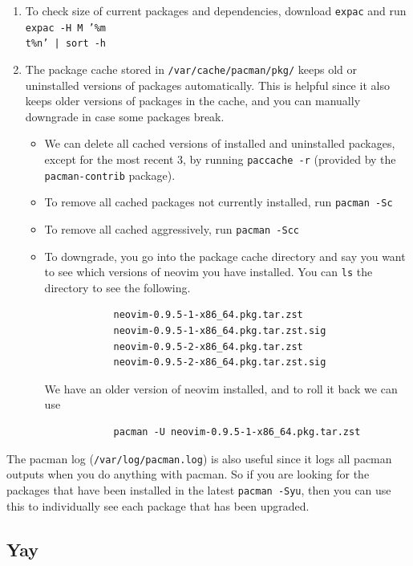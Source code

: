 \begin{enumerate}
      \item To check size of current packages and dependencies, download \texttt{expac} and run \texttt{expac -H M '\%m \\t\%n' | sort -h} 

      \item The package cache stored in \texttt{/var/cache/pacman/pkg/} keeps old or uninstalled versions of packages automatically. This is helpful since it also keeps older versions of packages in the cache, and you can manually downgrade in case some packages break.  
      \begin{itemize}
        \item We can delete all cached versions of installed and uninstalled packages, except for the most recent 3, by running \texttt{paccache -r} (provided by the \texttt{pacman-contrib} package). 
        \item To remove all cached packages not currently installed, run \texttt{pacman -Sc}
        \item To remove all cached aggressively, run \texttt{pacman -Scc}
        \item To downgrade, you go into the package cache directory and say you want to see which versions of neovim you have installed. You can \texttt{ls} the directory to see the following. 
        
          \begin{lstlisting}
            neovim-0.9.5-1-x86_64.pkg.tar.zst
            neovim-0.9.5-1-x86_64.pkg.tar.zst.sig
            neovim-0.9.5-2-x86_64.pkg.tar.zst
            neovim-0.9.5-2-x86_64.pkg.tar.zst.sig
          \end{lstlisting}

          We have an older version of neovim installed, and to roll it back we can use 
          \begin{lstlisting} 
            pacman -U neovim-0.9.5-1-x86_64.pkg.tar.zst
          \end{lstlisting}
      \end{itemize} 
    \end{enumerate}

    The pacman log (\texttt{/var/log/pacman.log}) is also useful since it logs all pacman outputs when you do anything with pacman. So if you are looking for the packages that have been installed in the latest \texttt{pacman -Syu}, then you can use this to individually see each package that has been upgraded. 

  \subsection{Yay}

